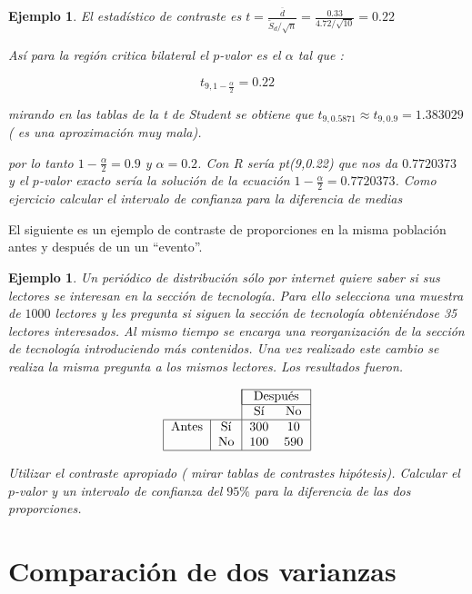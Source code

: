 \documentclass[12pt]{report}
\newtheorem{example}[definition]{Ejemplo}
\begin{document}
\begin{example}
El estadístico de contraste es $t=\frac{\overline{d}}{\tilde{S}_d/\sqrt{n}}=\frac{0.33}{4.72/\sqrt{10}}=0.22$

Así para la región critica bilateral el $p$-valor es el $\alpha$ tal que :

$$t_{9,1-\frac{\alpha}{2}}=0.22$$  


mirando en las tablas de la t de Student se obtiene que $t_{9,0.5871}\approx  t_{9,0.9}=1.383029$  ( es una aproximación muy mala).

por lo tanto $1-\frac{\alpha}{2}=0.9$ y $\alpha=0.2$. Con R sería pt(9,0.22) que nos da $0.7720373$
y el $p$-valor exacto sería la solución de la ecuación $1-\frac{\alpha}{2}=0.7720373$. Como ejercicio calcular el intervalo de confianza para la diferencia de medias






\end{example}


El siguiente es un ejemplo de contraste de proporciones en la misma población antes y después de un 
un ``evento''.

\begin{example}
Un periódico de distribución sólo por internet quiere saber si sus lectores se interesan en la sección de tecnología. Para ello selecciona una muestra  de $1000$ lectores y les pregunta si siguen la sección de tecnología obteniéndose 35 lectores interesados. Al mismo tiempo se encarga una reorganización de la sección de tecnología introduciendo más contenidos. Una vez realizado este cambio se realiza la misma pregunta a los mismos lectores. Los resultados fueron.

$$
\begin{tabular}{|c|c|cc|}
\cline{3-4}
     \multicolumn{2}{c|}{}& \multicolumn{2}{|c|} {Después}\\\cline{3-4}
   \multicolumn{2}{c|}{} & Sí & No \\\hline
Antes & Sí &  300 & 10 \\
    & No   & 100 & 590 
\\\hline
\end{tabular}
$$

Utilizar el contraste apropiado ( mirar tablas de contrastes hipótesis). Calcular el $p$-valor y un intervalo de confianza del $95\%$ para la diferencia de las dos proporciones.
\end{example}


\section{Comparación de dos varianzas}
\end{document}

